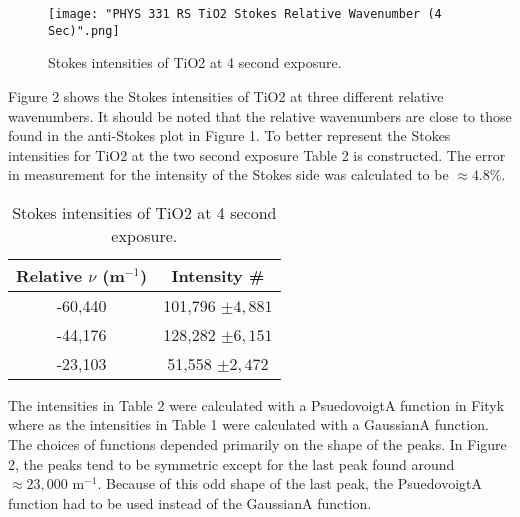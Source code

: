 \documentclass[twocolumn]{article}
\begin{document}
\begin{figure}[htb]
\centering
\texttt{[image: "PHYS 331 RS TiO2 Stokes Relative Wavenumber (4 Sec)".png]}
\caption{Stokes intensities of TiO2 at 4 second exposure.}
\label{s_ti_2sec}
\end{figure}
\newline
Figure 2 shows the Stokes intensities of TiO2 at three different relative wavenumbers. It should be noted that the relative wavenumbers are close to those found in the anti-Stokes plot in Figure 1. To better represent the Stokes intensities for TiO2 at the two second exposure Table 2 is constructed. The error in measurement for the intensity of the Stokes side was calculated to be $\approx 4.8\%$.
\begin{table}[htb]
\begin{center}
\begin{tabular}{|c|c|}
    \hline \textbf{Relative $\nu$ (m$^{-1}$)} & \textbf{Intensity \#} \\ \hline
    -60,440 & 101,796 $\pm 4,881$ \\ \hline
    -44,176 & 128,282 $\pm 6,151$ \\ \hline
    -23,103 & 51,558 $\pm 2,472$ \\ \hline
\end{tabular}
\caption{Stokes intensities of TiO2 at 4 second exposure.}
\end{center}
\label{default}
\end{table}%
\newline
The intensities in Table 2 were calculated with a PsuedovoigtA function in Fityk where as the intensities in Table 1 were calculated with a GaussianA function. The choices of functions depended primarily on the shape of the peaks. In Figure 2, the peaks tend to be symmetric except for the last peak found around $\approx 23,000$ m$^{-1}$. Because of this odd shape of the last peak, the PsuedovoigtA function had to be used instead of the GaussianA function.
\end{document}
